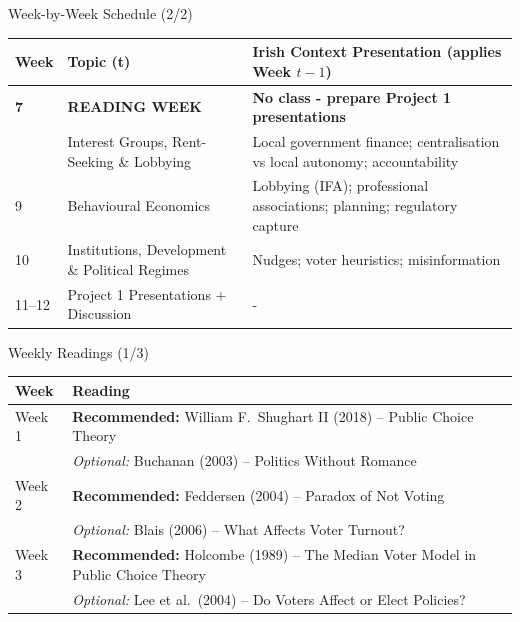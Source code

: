 \documentclass[10pt]{beamer}
\begin{document}
\begin{frame}{Week-by-Week Schedule (2/2)}
\small
\begin{tabular}{p{0.9cm} p{3.1cm} p{5.8cm}}
\toprule
\textbf{Week} & \textbf{Topic (t)} & \textbf{Irish Context Presentation (applies Week $t-1$)} \\
\midrule
\textbf{7} & \textbf{READING WEEK} & \textbf{No class - prepare Project 1 presentations} \\
\addlinespace
8 & Interest Groups, Rent-Seeking \& Lobbying & Local government finance; centralisation vs local autonomy; accountability \\
9 & Behavioural Economics & Lobbying (IFA); professional associations; planning; regulatory capture \\
10 & Institutions, Development \& Political Regimes & Nudges; voter heuristics; misinformation \\
11--12 & Project 1 Presentations + Discussion & - \\
\bottomrule
\end{tabular}
\end{frame}

\begin{frame}{Weekly Readings (1/3)}
\small
\begin{tabular}{p{1.5cm}p{8.5cm}}
\toprule
\textbf{Week} & \textbf{Reading} \\
\midrule
Week 1 & \textbf{Recommended:} William F.\ Shughart II (2018) -- Public Choice Theory \\
& \textit{Optional:} Buchanan (2003) -- Politics Without Romance \\
\addlinespace
Week 2 & \textbf{Recommended:} Feddersen (2004) -- Paradox of Not Voting \\
& \textit{Optional:} Blais (2006) -- What Affects Voter Turnout? \\
\addlinespace
Week 3 & \textbf{Recommended:} Holcombe (1989) -- The Median Voter Model in Public Choice Theory \\
& \textit{Optional:} Lee et al.\ (2004) -- Do Voters Affect or Elect Policies? \\
\bottomrule
\end{tabular}
\end{frame}
\end{document}

